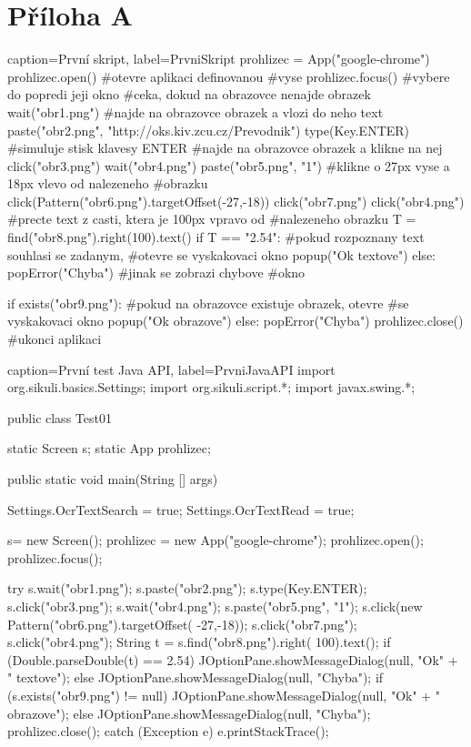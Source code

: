 \setcounter{chapter}{-1}
\chapter{Příloha A}
	\begin{lstpython}{caption={První skript}, label={PrvniSkript}}
prohlizec = App("google-chrome")
prohlizec.open()	#otevre aplikaci definovanou
				#vyse
prohlizec.focus()	#vybere do popredi jeji okno
#ceka, dokud na obrazovce nenajde obrazek
wait("obr1.png")
#najde na obrazovce obrazek a vlozi do neho text
paste("obr2.png", "http://oks.kiv.zcu.cz/Prevodnik")
type(Key.ENTER)	#simuluje stisk klavesy ENTER
#najde na obrazovce obrazek a klikne na nej
click("obr3.png")
wait("obr4.png")
paste("obr5.png", "1")
#klikne o 27px vyse a 18px vlevo od nalezeneho
#obrazku
click(Pattern("obr6.png").targetOffset(-27,-18))
click("obr7.png")
click("obr4.png")
#precte text z casti, ktera je 100px vpravo od
#nalezeneho obrazku
T = find("obr8.png").right(100).text()
if T == "2.54":
	#pokud rozpoznany text souhlasi se zadanym,
	#otevre se vyskakovaci okno
    popup("Ok textove")
else:
    popError("Chyba")    #jinak se zobrazi chybove
    			 #okno

if exists("obr9.png"):
	#pokud na obrazovce existuje obrazek, otevre
	#se vyskakovaci okno
    popup("Ok obrazove")
else:
    popError("Chyba")
prohlizec.close()    #ukonci aplikaci
	\end{lstpython}

	\begin{lstjava}{caption={První test Java API}, label={PrvniJavaAPI}}
import org.sikuli.basics.Settings;
import org.sikuli.script.*;
import javax.swing.*;

public class Test01 {

  static Screen s;
  static App prohlizec;
  
  public static void main(String [] args) {
    Settings.OcrTextSearch = true;
    Settings.OcrTextRead = true;

    s= new Screen();
    prohlizec = new App("google-chrome");
    prohlizec.open();
    prohlizec.focus();
    
    try {
      s.wait("obr1.png");
      s.paste("obr2.png");
      s.type(Key.ENTER);
      s.click("obr3.png");
      s.wait("obr4.png");
      s.paste("obr5.png", "1");
      s.click(new Pattern("obr6.png").targetOffset(
        -27,-18));
      s.click("obr7.png");
      s.click("obr4.png");
      String t = s.find("obr8.png").right(
        100).text();
      if (Double.parseDouble(t) == 2.54) {
        JOptionPane.showMessageDialog(null, "Ok" +
          " textove");
      } else {
        JOptionPane.showMessageDialog(null, "Chyba");
      }
      if (s.exists("obr9.png") != null) {
        JOptionPane.showMessageDialog(null, "Ok" +
          " obrazove");
      } else {
        JOptionPane.showMessageDialog(null, "Chyba");
      }
      prohlizec.close();
    } catch (Exception e) {
      e.printStackTrace();
    }
  }
}
	\end{lstjava}
	
